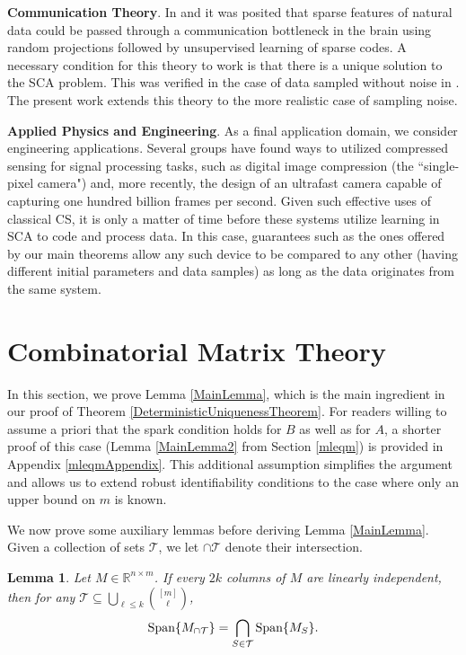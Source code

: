 \documentclass[journal, onecolumn]{IEEEtran}
\newtheorem{lemma}{Lemma}
\begin{document}
\textbf{Communication Theory}.
In \cite{coulter2010adaptive} and \cite{isely2010deciphering} it was posited that sparse features of natural data could be passed through a communication bottleneck in the brain using random projections followed by unsupervised learning of sparse codes.  A necessary condition for this theory to work is that there is a unique solution to the SCA problem.  This was verified in the case of data sampled without noise in \cite{Hillar15}.  The present work extends this theory to the more realistic case of sampling noise.

\textbf{Applied Physics and Engineering}.
As a final application domain, we consider engineering applications.  Several groups have found ways to utilized compressed sensing for signal processing tasks, such as digital image compression \cite{SinglePixelCamera} (the ``single-pixel camera") and, more recently, the design of an ultrafast camera \cite{gao2014single} capable of capturing one hundred billion frames per second. Given such effective uses of classical CS, it is only a matter of time before these systems utilize learning in SCA to code and process data.  In this case, guarantees such as the ones offered by our main theorems allow any such device to be compared to any other (having different initial parameters and data samples) as long as the data originates from the same system.

\appendices
\section{Combinatorial Matrix Theory}\label{appendixA}

In this section, we prove Lemma \ref{MainLemma}, which is the main ingredient in our proof of Theorem \ref{DeterministicUniquenessTheorem}. For readers willing to assume a priori that the spark condition holds for $B$ as well as for $A$, a shorter proof of this case (Lemma \ref{MainLemma2} from Section \ref{mleqm}) is provided in Appendix \ref{mleqmAppendix}. This additional assumption simplifies the argument and allows us to extend robust identifiability conditions to the case where only an upper bound on $m$ is known. 

We now prove some auxiliary lemmas before deriving Lemma \ref{MainLemma}.  Given a collection of sets $\mathcal{T}$, we let $\cap \mathcal{T}$ denote their intersection.

\begin{lemma}\label{SpanIntersectionLemma}
Let $M \in \mathbb{R}^{n \times m}$. If every $2k$ columns of $M$ are linearly independent, then for any $\mathcal{T} \subseteq \bigcup_{\ell \leq k} {[m] \choose \ell}$,
\begin{align}
\text{\rm Span}\{M_{\cap \mathcal{T}}\}  = \bigcap_{S \in \mathcal{T}} \text{\rm Span}\{M_S\}.
\end{align}
\end{lemma}
\end{document}
